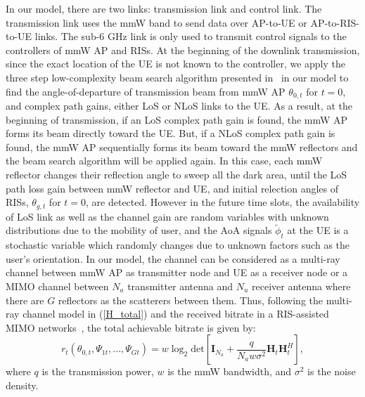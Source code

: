 \documentclass[conference]{IEEEtran}
\begin{document}
In our model, there are two links: transmission link and control link. The transmission link uses the mmW band to send data over AP-to-UE or AP-to-RIS-to-UE links. The sub-6 GHz link is only used to transmit control signals to the controllers of mmW AP and RISs.  At the beginning of the downlink transmission, since the exact location of the UE is not known to the controller, we apply the three step low-complexity beam search algorithm presented in~\cite{ChannelEstimation} in our model to find the angle-of-departure of transmission beam from mmW AP $\theta_{0,t}$ for $t=0$, and complex path gains, either LoS or NLoS links to the UE. As a result, at the beginning of transmission, if an LoS complex path gain is found, the mmW AP forms its beam directly toward the UE. But, if a NLoS complex path gain is found, the mmW AP sequentially forms its beam toward the mmW reflectors and the beam search algorithm will be applied again. In this case, each mmW reflector changes their reflection angle to sweep all the dark area, until the LoS path loss gain between mmW reflector and UE, and initial relection angles of RISs, $\theta_{g,t}$ for $t=0$, are detected. However in the future time slots, the availability of LoS link as well as the channel gain are random variables with unknown distributions due to the mobility of user, and the AoA signals $\tilde{\phi}_{t}$ at the UE  is a stochastic variable which randomly changes due to unknown factors such as the user's orientation. In our model, the channel can be considered as a multi-ray channel between mmW AP as transmitter node and UE as a receiver node or a MIMO channel between $N_a$ transmitter antenna and $N_u$ receiver antenna where there are $G$ reflectors as the scatterers between them. Thus, following the multi-ray channel model in (\ref{H_total}) and the received bitrate in a RIS-assisted MIMO networks~\cite{9403420}, the total achievable bitrate is given by:
\begin{equation}
r_{t}(\theta_{0,t},\Psi_{1t},...,\Psi_{Gt})=w \log_2 \text{det}\left[\boldsymbol{I}_{N_a}+\frac{q}{N_a w\sigma^2}
\boldsymbol{H}_t \boldsymbol{H}_t^H\right],
\label{Bit_rate}
\end{equation}
where $q$ is the transmission power, $w$ is the mmW bandwidth, and $\sigma^2$ is the noise density.
\end{document}
